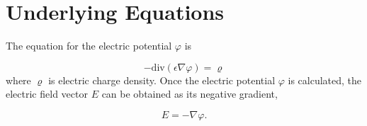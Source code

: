 \documentclass{article}
\begin{document}
\section{Underlying Equations}

The equation for the electric potential $\varphi$ is 

$$
-\mbox{div}(\epsilon \nabla \varphi) = \varrho
$$
where $\varrho$ is electric charge density. Once the electric potential 
$\varphi$ is calculated, the electric field vector $E$ can be obtained
as its negative gradient,

$$
E = -\nabla \varphi.
$$
\end{document}
